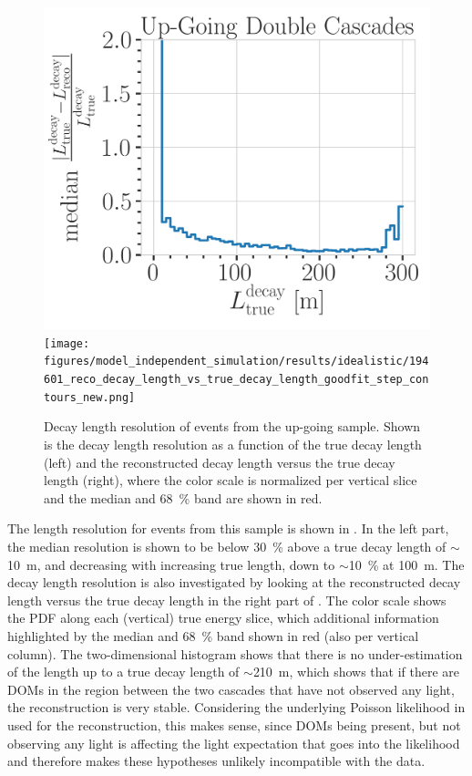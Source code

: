 \begin{figure}[h]
	\centering
    \includegraphics[width=0.49\linewidth]{figures/model_independent_simulation/results/idealistic/194601_median_decay_length_resolution_goodfit_log_unweighted.png}
    \texttt{[image: figures/model\_independent\_simulation/results/idealistic/194601\_reco\_decay\_length\_vs\_true\_decay\_length\_goodfit\_step\_contours\_new.png]}
    \caption[Up-going double cascade decay length resolution]{Decay length resolution of events from the up-going sample. Shown is the decay length resolution as a function of the true decay length (left) and the reconstructed decay length versus the true decay length (right), where the color scale is normalized per vertical slice and the median and \SI{68}{\percent} band are shown in red.}
\end{figure}

The length resolution for events from this sample is shown in . In the left part, the median resolution is shown to be below \SI{30}{\percent} above a true decay length of $\sim$\SI{10}{\meter}, and decreasing with increasing true length, down to $\sim$\SI{10}{\percent} at \SI{100}{\meter}. The decay length resolution is also investigated by looking at the reconstructed decay length versus the true decay length in the right part of . The color scale shows the PDF along each (vertical) true energy slice, which additional information highlighted by the median and \SI{68}{\percent} band shown in red (also per vertical column). The two-dimensional histogram shows that there is no under-estimation of the length up to a true decay length of $\sim$\SI{210}{\meter}, which shows that if there are DOMs in the region between the two cascades that have not observed any light, the reconstruction is very stable. Considering the underlying Poisson likelihood in  used for the reconstruction, this makes sense, since DOMs being present, but not observing any light is affecting the light expectation that goes into the likelihood and therefore makes these hypotheses unlikely incompatible with the data.


